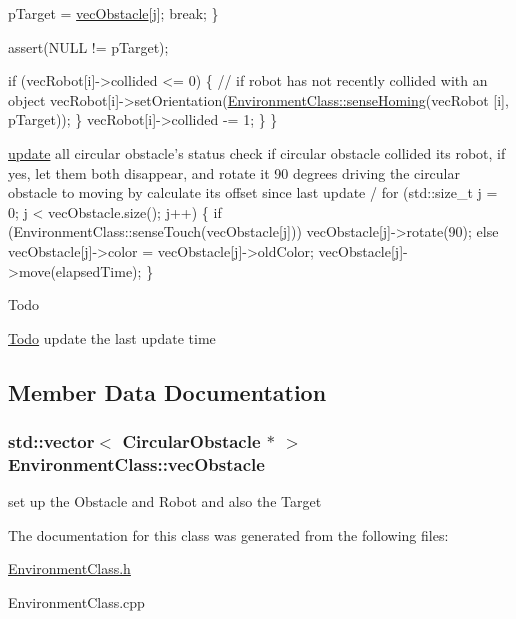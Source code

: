 \begin{DoxyCode}
            pTarget = \hyperlink{classEnvironmentClass_a738593c1c3ed257bea8f99f663f59d85}{vecObstacle}[j];
            \textcolor{keywordflow}{break};
        \}
        
        assert(NULL != pTarget);

        \textcolor{keywordflow}{if} (vecRobot[i]->collided <= 0) \{ \textcolor{comment}{// if robot has not recently collided with an object}
            vecRobot[i]->setOrientation(\hyperlink{classEnvironmentClass_a5b501f7123ca5ba7fd711a44a3d0141e}{EnvironmentClass::senseHoming}(vecRobot
      [i], pTarget));
        \}
        vecRobot[i]->collided -= 1;
    \}
\}
\end{DoxyCode}



\begin{DoxyCode}
   \hyperlink{classEnvironmentClass_a2ea61074efd8e3f099e2876a101c219f}{update} all circular obstacle\textcolor{stringliteral}{'s status}
\textcolor{stringliteral}{   check if circular obstacle collided its robot, if yes, let them both disappear, and rotate it 90 degrees}
\textcolor{stringliteral}{   driving the circular obstacle to moving by calculate its offset since last update}
\textcolor{stringliteral}{  / }
\textcolor{stringliteral}{for (std::size\_t j = 0; j < vecObstacle.size(); j++)}
\textcolor{stringliteral}{\{}
\textcolor{stringliteral}{    if (EnvironmentClass::senseTouch(vecObstacle[j]))}
\textcolor{stringliteral}{        vecObstacle[j]->rotate(90);}
\textcolor{stringliteral}{    else}
\textcolor{stringliteral}{        vecObstacle[j]->color = vecObstacle[j]->oldColor;}
\textcolor{stringliteral}{    }
\textcolor{stringliteral}{    vecObstacle[j]->move(elapsedTime);}
\textcolor{stringliteral}{\}}
\end{DoxyCode}


\begin{DoxyRefDesc}{Todo}
\item[\hyperlink{todo__todo000006}{Todo}]update the last update time \end{DoxyRefDesc}


\subsection{Member Data Documentation}
\hypertarget{classEnvironmentClass_a738593c1c3ed257bea8f99f663f59d85}{
\subsubsection[{vec\-Obstacle}]{\setlength{\rightskip}{0pt plus 5cm}std\-::vector$<$ {\bf Circular\-Obstacle} $\ast$ $>$ Environment\-Class\-::vec\-Obstacle\hspace{0.3cm}{\ttfamily [static]}}}\label{classEnvironmentClass_a738593c1c3ed257bea8f99f663f59d85}
set up the Obstacle and Robot and also the Target 

The documentation for this class was generated from the following files\-:\begin{DoxyCompactItemize}
\item 
\hyperlink{EnvironmentClass_8h}{Environment\-Class.\-h}\item 
Environment\-Class.\-cpp\end{DoxyCompactItemize}
